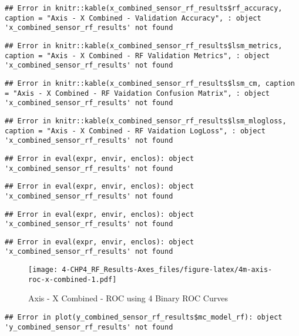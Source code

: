 \documentclass[]{article}
\begin{document}
\begin{verbatim}
## Error in knitr::kable(x_combined_sensor_rf_results$rf_accuracy, caption = "Axis - X Combined - Validation Accuracy", : object 'x_combined_sensor_rf_results' not found
\end{verbatim}

\begin{verbatim}
## Error in knitr::kable(x_combined_sensor_rf_results$lsm_metrics, caption = "Axis - X Combined - RF Validation Metrics", : object 'x_combined_sensor_rf_results' not found
\end{verbatim}

\begin{verbatim}
## Error in knitr::kable(x_combined_sensor_rf_results$lsm_cm, caption = "Axis - X Combined - RF Vaidation Confusion Matrix", : object 'x_combined_sensor_rf_results' not found
\end{verbatim}

\begin{verbatim}
## Error in knitr::kable(x_combined_sensor_rf_results$lsm_mlogloss, caption = "Axis - X Combined - RF Vaidation LogLoss", : object 'x_combined_sensor_rf_results' not found
\end{verbatim}

\begin{verbatim}
## Error in eval(expr, envir, enclos): object 'x_combined_sensor_rf_results' not found
\end{verbatim}

\begin{verbatim}
## Error in eval(expr, envir, enclos): object 'x_combined_sensor_rf_results' not found
\end{verbatim}

\begin{verbatim}
## Error in eval(expr, envir, enclos): object 'x_combined_sensor_rf_results' not found
\end{verbatim}

\begin{verbatim}
## Error in eval(expr, envir, enclos): object 'x_combined_sensor_rf_results' not found
\end{verbatim}

\begin{figure}
\centering
\texttt{[image: 4-CHP4\_RF\_Results-Axes\_files/figure-latex/4m-axis-roc-x-combined-1.pdf]}
\caption{Axis - X Combined - ROC using 4 Binary ROC Curves}
\end{figure}

\begin{verbatim}
## Error in plot(y_combined_sensor_rf_results$mc_model_rf): object 'y_combined_sensor_rf_results' not found
\end{verbatim}
\end{document}
